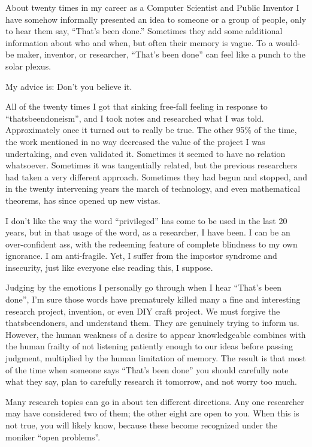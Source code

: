 \documentclass[
	fontsize=10pt, %
	twoside=false, %
	secnumdepth=1, %
]{kaobook}
\begin{document}
About twenty times in my career as a Computer Scientist and Public
Inventor I have somehow informally presented an idea to someone or a
group of people, only to hear them say, “That’s been done.”  Sometimes
they add some additional information about who and when, but often
their memory is vague.  To a would-be maker, inventor, or researcher,
“That’s been done” can feel like a punch to the solar plexus.

My advice is: Don’t you believe it.

All of the twenty times I got that sinking free-fall feeling in
response to “thatsbeendoneism”, and I took notes and researched what I
was told. Approximately once it turned out to really be true.  The
other 95\% of the time, the work mentioned in no way decreased the
value of the project I was undertaking, and even validated
it. Sometimes it seemed to have no relation whatsoever. Sometimes it
was tangentially related, but the previous researchers had taken a
very different approach. Sometimes they had begun and stopped, and in
the twenty intervening years the march of technology, and even
mathematical theorems, has since opened up new vistas.

I don’t like the way the word “privileged” has come to be used in the
last 20 years, but in that usage of the word, as a researcher, I have
been. I can be an over-confident ass, with the redeeming feature of
complete blindness to my own ignorance. I am anti-fragile. Yet, I
suffer from the impostor syndrome and insecurity, just like everyone
else reading this, I suppose.

Judging by the emotions I personally go through when I hear “That’s
been done”, I’m sure those words have prematurely killed many a fine
and interesting research project, invention, or even DIY craft
project.  We must forgive the thatsbeendoners, and understand
them. They are genuinely trying to inform us. However, the human
weakness of a desire to appear knowledgeable combines with the human
frailty of not listening patiently enough to our ideas before passing
judgment, multiplied by the human limitation of memory. The result is
that most of the time when someone says “That’s been done” you should
carefully note what they say, plan to carefully research it tomorrow,
and not worry too much.

Many research topics can go in about ten different directions. Any one
researcher may have considered two of them; the other eight are open
to you. When this is not true, you will likely know, because these
become recognized under the moniker “open problems”.
\end{document}

